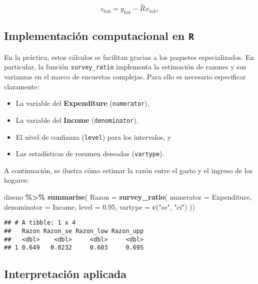 \documentclass[
  12pt,
]{book}
\newenvironment{Shaded}{\begin{snugshade}}{\end{snugshade}}
\newcommand{\AttributeTok}[1]{\textcolor[rgb]{0.13,0.29,0.53}{#1}}
\newcommand{\FloatTok}[1]{\textcolor[rgb]{0.00,0.00,0.81}{#1}}
\newcommand{\FunctionTok}[1]{\textcolor[rgb]{0.13,0.29,0.53}{\textbf{#1}}}
\newcommand{\NormalTok}[1]{#1}
\newcommand{\SpecialCharTok}[1]{\textcolor[rgb]{0.81,0.36,0.00}{\textbf{#1}}}
\newcommand{\StringTok}[1]{\textcolor[rgb]{0.31,0.60,0.02}{#1}}
\providecommand{\tightlist}{%
  \setlength{\itemsep}{0pt}\setlength{\parskip}{0pt}}
\begin{document}
\[
z_{hik} = y_{hik} - \hat{R}x_{hik},
\]

\subsection*{\texorpdfstring{Implementación computacional en \texttt{R}}{Implementación computacional en R}}\label{implementaciuxf3n-computacional-en-r}

En la práctica, estos cálculos se facilitan gracias a los paquetes especializados. En particular, la función \texttt{survey\_ratio} implementa la estimación de razones y sus varianzas en el marco de encuestas complejas. Para ello es necesario especificar claramente:

\begin{itemize}
\tightlist
\item
  La variable del \textbf{Expenditure} (\texttt{numerator}),
\item
  La variable del \textbf{Income} (\texttt{denominator}),
\item
  El nivel de confianza (\texttt{level}) para los intervalos, y
\item
  Las estadísticas de resumen deseadas (\texttt{vartype}).
\end{itemize}

A continuación, se ilustra cómo estimar la razón entre el gasto y el ingreso de los hogares:

\begin{Shaded}
\begin{Highlighting}[]
\NormalTok{diseno }\SpecialCharTok{\%\textgreater{}\%} \FunctionTok{summarise}\NormalTok{(}
    \AttributeTok{Razon =}  \FunctionTok{survey\_ratio}\NormalTok{(}
      \AttributeTok{numerator =}\NormalTok{ Expenditure,}
      \AttributeTok{denominator =}\NormalTok{ Income,}
      \AttributeTok{level =} \FloatTok{0.95}\NormalTok{,}
    \AttributeTok{vartype =}  \FunctionTok{c}\NormalTok{(}\StringTok{"se"}\NormalTok{, }\StringTok{"ci"}\NormalTok{)}
\NormalTok{    ))}
\end{Highlighting}
\end{Shaded}

\begin{verbatim}
## # A tibble: 1 x 4
##   Razon Razon_se Razon_low Razon_upp
##   <dbl>    <dbl>     <dbl>     <dbl>
## 1 0.649   0.0232     0.603     0.695
\end{verbatim}

\subsection*{Interpretación aplicada}\label{interpretaciuxf3n-aplicada}
\end{document}
